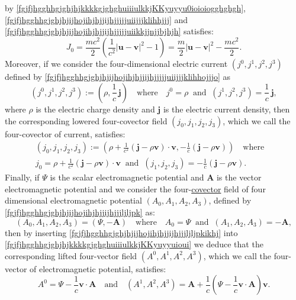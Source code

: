 \documentclass{article}
\theoremstyle{definition}
\theoremstyle{remark}
\renewcommand{\vec}[1]{\mathbf{#1}}
\newcommand{\er}{\eqref}
\newcommand{\er}{\eqref}
\begin{document}
by \er{fgjfjhgghhgjghjhjkkkkgjghghuiiiulkkjKKyuyyu0ioioiogghghgh},
\er{fgjfjhgghhgjghjhjijhojihjhjjijhjjjjjuiijjjklihhjjj} and
\er{fgjfjhgghhgjghjhjijhojihjhjjijhjjjjjuiikkjjnjjbjhjh} satisfies:
\begin{equation}\label{fgjfjhgghhgjghjhjkkkkgjghghuiiiulkkjKKyuyyu0ioioiogghghghgghgh}
J_0=\frac{mc^2}{2}\left(\frac{1}{c^2}\left|\vec u-\vec
v\right|^2-1\right)=\frac{m}{2}\left|\vec u-\vec
v\right|^2-\frac{mc^2}{2}.
\end{equation}
Moreover, if we consider the  four-dimensional electric current
$(j^0,j^1,j^2,j^3)$ defined by
\er{fgjfjhgghhgjghjhjijhojihjhjjijhjjjjjuiijjjklihhojjjo} as
\begin{equation}\label{fgjfjhgghhgjghjhjijhojihjhjjijhjjjjjuiijjjklihhojjjokjkj}
(j^0,j^1,j^2,j^3):=\left(\rho,\frac{1}{c}\,\vec
j\right)\quad\text{where}\quad
j^0=\rho\;\;\text{and}\;\;(j^1,j^2,j^3)=\frac{1}{c}\,\vec j,
\end{equation}
where $\rho$ is the electric charge density and $\vec j$ is the
electric current density, then the corresponding lowered
four-covector field $(j_0,j_1,j_2,j_3)$, which we call the
four-covector of current, satisfies:
\begin{multline}\label{fgjfjhgghhgjghjhjijhojihjhjjijhjjjjjuiikkjjnjjbjhjhiyuyug}
(j_0,j_1,j_2,j_3):=\left(\rho+\frac{1}{c^2}\left(\vec j-\rho\vec
v\right)\cdot\vec v,-\frac{1}{c}\left(\vec j-\rho\vec
v\right)\right)\quad\text{where}\quad\\
j_0=\rho+\frac{1}{c^2}\left(\vec j-\rho\vec v\right)\cdot\vec
v\;\;\text{and}\;\;(j_1,j_2,j_3)=-\frac{1}{c}\left(\vec j-\rho\vec
v\right).
\end{multline}
Finally, if $\Psi$ is the scalar electromagnetic potential and $\vec
A$ is the vector electromagnetic potential and we consider the
four-\underline{covector} field of four dimensional electromagnetic
potential $(A_0,A_1,A_2,A_3)$, defined by
\er{fgjfjhgghhgjghjhjijhojihjhjjijhjjjljljpk} as:
\begin{equation}\label{fgjfjhgghhgjghjhjijhojihjhjjijhjjjljljpkikhj}
(A_0,A_1,A_2,A_3)=(\Psi,-\vec A)\quad\text{where}\quad
A_0=\Psi\;\;\text{and}\;\;(A_1,A_2,A_3)=-\vec A,
\end{equation}
then by inserting \er{fgjfjhgghhgjghjhjijhojihjhjjijhjjjljljpkikhj}
into \er{fgjfjhgghhgjghjhjkkkkgjghghuiiiulkkjKKyuyyuioui} we deduce
that the corresponding lifted four-vector field $(A^0,A^1,A^2,A^3)$,
which we call the four-vector of electromagnetic potential,
satisfies:
\begin{equation}\label{fgjfjhgghhgjghjhjkkkkgjghghuiiiulkkjKKyuyyuiouigjguuuiui}
A^0=\Psi-\frac{1}{c}\vec v\cdot\vec
A\quad\text{and}\quad(A^1,A^2,A^3)=\vec
A+\frac{1}{c}\left(\Psi-\frac{1}{c}\vec v\cdot\vec A\right)\vec v.
\end{equation}
\end{document}
